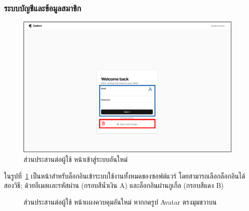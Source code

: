 \documentclass[12pt,one side,openright,a4paper]{cpe-thesis-th}
\newcommand{\thaijustify}[1]{%
  \par\hspace{30pt}\justifying
  #1
}
\begin{document}
            \subsubsection{ระบบบัญชีและข้อมูลสมาชิก}
                \begin{figure}[H]
                    \centering
                    \includegraphics[width=15cm]{figure/new-ui/ui-login1.png}
                    \caption[ส่วนประสานต่อผู้ใช้ หน้าเข้าสู่ระบบใหม่]{ส่วนประสานต่อผู้ใช้ หน้าเข้าสู่ระบบอันใหม่}\label{fig:new-ui-login}
                \end{figure}
                \thaijustify{
                    ในรูปที่~\ref{fig:new-ui-login} เป็นหน้าสำหรับล็อกอินเข้าระบบใช้งานทั้งหมดของซอฟต์แวร์ โดยสามารถเลือกล็อกอินได้สองวิธี; ด้วยอีเมลเเละรหัสผ่าน (กรอบสีน้ำเงิน A) และล็อกอินผ่านกูเกิ้ล (กรอบสีแดง B) 
                } 
                \begin{figure}[H]
                    \centering
                    \caption[ส่วนประสานต่อผู้ใช้ หน้าเเผงควบคุมใหม่ (กดรูป Avatar)]{ส่วนประสานต่อผู้ใช้ หน้าเเผงควบคุมอันใหม่ หากกดรูป Avatar ตรงมุมขวาบน}
                    \label{fig:new-ui-dashboard5}
                \end{figure}
\end{document}
